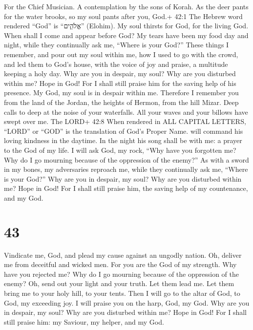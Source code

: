 For the Chief Musician. A contemplation by the sons of Korah.
 As the deer pants for the water brooks, so my soul pants
after you, God.+ 42:1 The Hebrew word rendered ``God'' is ``אֱלֹהִ֑ים''
(Elohim).  My soul thirsts for God, for the living God. When
shall I come and appear before God?  My tears have been my
food day and night, while they continually ask me, ``Where is your
God?''  These things I remember, and pour out my soul within
me, how I used to go with the crowd, and led them to God's house, with
the voice of joy and praise, a multitude keeping a holy day.
 Why are you in despair, my soul? Why are you disturbed
within me? Hope in God! For I shall still praise him for the saving help
of his presence.  My God, my soul is in despair within me.
Therefore I remember you from the land of the Jordan, the heights of
Hermon, from the hill Mizar.  Deep calls to deep at the
noise of your waterfalls. All your waves and your billows have swept
over me.  The LORD+ 42:8 When rendered in ALL CAPITAL
LETTERS, ``LORD'' or ``GOD'' is the translation of God's Proper Name.
will command his loving kindness in the daytime. In the night his song
shall be with me: a prayer to the God of my life.  I will
ask God, my rock, ``Why have you forgotten me? Why do I go mourning
because of the oppression of the enemy?''  As with a sword
in my bones, my adversaries reproach me, while they continually ask me,
``Where is your God?''  Why are you in despair, my soul?
Why are you disturbed within me? Hope in God! For I shall still praise
him, the saving help of my countenance, and my God.

\hypertarget{section-42}{%
\section{43}\label{section-42}}

 Vindicate me, God, and plead my cause against an ungodly
nation. Oh, deliver me from deceitful and wicked men.  For
you are the God of my strength. Why have you rejected me? Why do I go
mourning because of the oppression of the enemy?  Oh, send
out your light and your truth. Let them lead me. Let them bring me to
your holy hill, to your tents.  Then I will go to the altar
of God, to God, my exceeding joy. I will praise you on the harp, God, my
God.  Why are you in despair, my soul? Why are you disturbed
within me? Hope in God! For I shall still praise him: my Saviour, my
helper, and my God.

